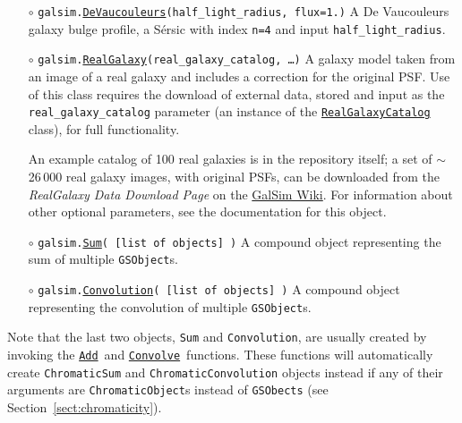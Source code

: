 \documentclass[preprint,10pt]{../../devel/modules/aastex}
\newcommand\Add{\href{http://galsim-developers.github.io/GalSim/namespacegalsim_1_1compound.html\#ad3f305087db1b740376666d9c022d94e}{\texttt{Add}}}
\newcommand\Convolve{\href{http://galsim-developers.github.io/GalSim/namespacegalsim_1_1compound.html\#a17ccb8acb75a4eb6e35e791e4177957b}{\texttt{Convolve}}}
\begin{document}
\begin{itemize}
\item[$\circ$]
  \texttt{galsim.}\href{http://galsim-developers.github.com/GalSim/classgalsim_1_1base_1_1_de_vaucouleurs.html}{\texttt{DeVaucouleurs}}\texttt{(half\_light\_radius, flux=1.)}
    \newline 
    A De Vaucouleurs galaxy bulge profile, a S\'{e}rsic
    with index \texttt{n=4} and input \texttt{half\_light\_radius}.
\item[$\circ$]
  \texttt{galsim.}\href{http://galsim-developers.github.io/GalSim/classgalsim_1_1real_1_1_real_galaxy.html}{\texttt{RealGalaxy}}\texttt{(real\_galaxy\_catalog, \dots)}
    \newline 
    A galaxy model taken from an image of a real galaxy and includes
    a correction for the original PSF.   Use of this class requires the
    download of external data, stored and input as the
    \texttt{real\_galaxy\_catalog} parameter (an instance of the
    \href{http://galsim-developers.github.com/GalSim/classgalsim_1_1real_1_1_real_galaxy_catalog.html}{\texttt{RealGalaxyCatalog}}
    class), for full functionality.

    An example catalog of 100 real galaxies is in the repository itself; a set of $\sim$26\,000 real 
    galaxy images, with original PSFs, can be downloaded from the
    \emph{RealGalaxy Data Download Page} on the
    \href{https://github.com/GalSim-developers/GalSim/wiki/RealGalaxy\%20Data}{GalSim Wiki}. For information
    about other optional parameters, see the documentation for this object.
\item[$\circ$]
  \texttt{galsim.}\href{http://galsim-developers.github.io/GalSim/classgalsim_1_1compound_1_1_sum.html}{\texttt{Sum}}\texttt{( [list of objects] )}
    \newline 
    A {compound} object representing the sum of multiple \texttt{GSObject}s.
\item[$\circ$]
  \texttt{galsim.}\href{http://galsim-developers.github.io/GalSim/classgalsim_1_1compound_1_1_convolution.html}{\texttt{Convolution}}\texttt{( [list of objects] )}
    \newline 
    A compound object representing the convolution of multiple \texttt{GSObject}s.
\end{itemize}

Note that the last two objects, \texttt{Sum} and \texttt{Convolution}, are usually created by
invoking the \Add\ and \Convolve\ functions.  These functions will
automatically create \texttt{ChromaticSum} and \texttt{ChromaticConvolution} objects instead if
any of their arguments are \texttt{ChromaticObject}s instead of
\texttt{GSObects} (see Section~\ref{sect:chromaticity}).
\end{document}
